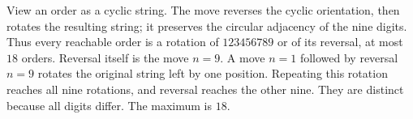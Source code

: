 View an order as a cyclic string. The move reverses the cyclic orientation, then rotates the resulting string; it preserves the circular adjacency of the nine digits. Thus every reachable order is a rotation of $123456789$ or of its reversal, at most $18$ orders. Reversal itself is the move $n=9$. A move $n=1$ followed by reversal $n=9$ rotates the original string left by one position. Repeating this rotation reaches all nine rotations, and reversal reaches the other nine. They are distinct because all digits differ. The maximum is $\boxed{18}$.
